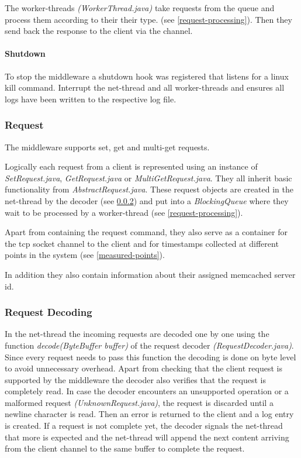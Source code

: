 \documentclass[11pt,a4paper]{article}
\begin{document}
The worker-threads \emph{(WorkerThread.java)} take requests from the queue and process them according to their their type. (see \ref{request-processing}). Then they send back the response to the client via the channel.


\paragraph{Shutdown}
To stop the middleware a shutdown hook was registered that listens for a linux kill command.
Interrupt the net-thread and all worker-threads and ensures all logs have been written to the respective log file.

\subsubsection{Request}
The middleware supports set, get and multi-get requests.

Logically each request from a client is represented using an instance of \emph{SetRequest.java}, \emph{GetRequest.java} or \emph{MultiGetRequest.java}. They all inherit basic functionality from \emph{AbstractRequest.java}.
These request objects are created in the net-thread by the decoder (see \ref{request-decoding}) and put into a \emph{BlockingQueue} where they wait to be processed by a worker-thread (see \ref{request-processing}).

Apart from containing the request command, they also serve as a container for the tcp socket channel to the client and for timestamps collected at different points in the system (see \ref{measured-points}).

In addition they also contain information about their assigned memcached server id.

\subsubsection{Request Decoding}\label{request-decoding}
In the net-thread the incoming requests are decoded one by one using the function \emph{decode(ByteBuffer buffer)} of the request decoder \emph{(RequestDecoder.java)}.
Since every request needs to pass this function the decoding is done on byte level to avoid unnecessary overhead.
Apart from checking that the client request is supported by the middleware the decoder also verifies that the request is completely read. In case the decoder encounters an unsupported operation or a malformed request \emph{(UnknownRequest.java)}, the request is discarded until a newline character is read. Then an error is returned to the client and a log entry is created. If a request is not complete yet, the decoder signals the net-thread that more is expected and the net-thread will append the next content arriving from the client channel to the same buffer to complete the request.
\end{document}
